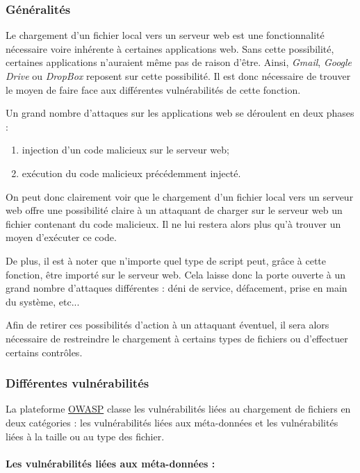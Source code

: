 \subsubsection{Généralités}

Le chargement d'un fichier local vers un serveur web est une fonctionnalité nécessaire voire inhérente à certaines applications web. Sans cette possibilité, certaines applications n'auraient même pas de raison d'être. Ainsi, \textit{Gmail}, \textit{Google Drive} ou \textit{DropBox} reposent sur cette possibilité. Il est donc nécessaire de trouver le moyen de faire face aux différentes vulnérabilités de cette fonction.

Un grand nombre d'attaques sur les applications web se déroulent en deux phases :
\begin{enumerate}
\item injection d'un code malicieux sur le serveur web;
\item exécution du code malicieux précédemment injecté.
\end{enumerate} 
On peut donc clairement voir que le chargement d'un fichier local vers un serveur web offre une possibilité claire à un attaquant de charger sur le serveur web un fichier contenant du code malicieux. Il ne lui restera alors plus qu'à trouver un moyen d'exécuter ce code.

De plus, il est à noter que n'importe quel type de script peut, grâce à cette fonction, être importé sur le serveur web. Cela laisse donc la porte ouverte à un grand nombre d'attaques différentes : déni de service, défacement, prise en main du système, etc...

Afin de retirer ces possibilités d'action à un attaquant éventuel, il sera alors nécessaire de restreindre le chargement à certains types de fichiers ou d'effectuer certains contrôles.

\subsubsection{Différentes vulnérabilités}

La plateforme \href{http://www.owasp.org}{OWASP} classe les vulnérabilités liées au chargement de fichiers en deux catégories : les vulnérabilités liées aux méta-données et les vulnérabilités liées à la taille ou au type des fichier.

\paragraph{Les vulnérabilités liées aux méta-données :}


